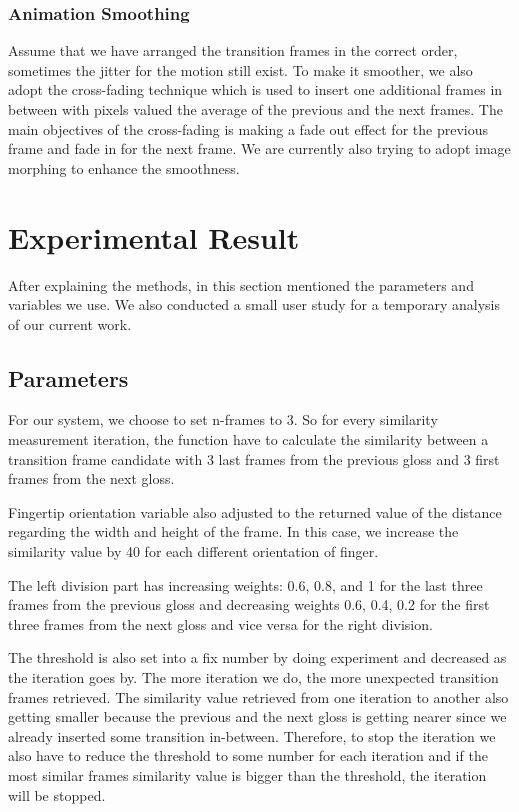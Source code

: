 \documentclass{sig-alternate-05-2015}
\begin{document}
\subsubsection{Animation Smoothing}
Assume that we have arranged the transition frames in the correct order, sometimes the jitter for the motion still exist. To make it smoother, we also adopt the cross-fading technique which is used to insert one additional frames in between with pixels valued the average of the previous and the next frames. The main objectives of the cross-fading is making a fade out effect for the previous frame and fade in for the next frame. We are currently also trying to adopt image morphing to enhance the smoothness.

\section{Experimental Result}
After explaining the methods, in this section mentioned the parameters and variables we use. We also conducted a small user study for a temporary analysis of our current work.

\subsection{Parameters}
For our system, we choose to set n-frames to 3. So for every similarity measurement iteration, the function have to calculate the similarity between a transition frame candidate with 3 last frames from the previous gloss and 3 first frames from the next gloss.

Fingertip orientation variable also adjusted to the returned value of the distance regarding the width and height of the frame. In this case, we increase the similarity value by 40 for each different orientation of finger.

The left division part has increasing weights: 0.6, 0.8, and 1 for the last three frames from the previous gloss and decreasing weights 0.6, 0.4, 0.2 for the first three frames from the next gloss and vice versa for the right division.

The threshold is also set into a fix number by doing experiment and decreased as the iteration goes by. The more iteration we do, the more unexpected transition frames retrieved. The similarity value retrieved from one iteration to another also getting smaller because the previous and the next gloss is getting nearer since we already inserted some transition in-between. Therefore, to stop the iteration we also have to reduce the threshold to some number for each iteration and if the most similar frames similarity value is bigger than the threshold, the iteration will be stopped. 
\end{document}
